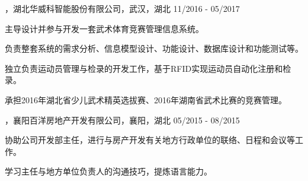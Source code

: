 
\begin{cventries}

\cvexperience
{，湖北华威科智能股份有限公司，武汉，湖北}
{11/2016 - 05/2017}
{
    \begin{cvitems}
    \item {主导设计并参与开发一套武术体育竞赛管理信息系统。}
    \item {负责整套系统的需求分析、信息模型设计、功能设计、数据库设计和功能测试等。}
    \item {独立负责运动员管理与检录的开发工作，基于RFID实现运动员自动化注册和检录。}
    \item {承担2016年湖北省少儿武术精英选拔赛、2016年湖南省武术比赛的竞赛管理。}
    \end{cvitems}
}

\cvexperience
{，襄阳百洋房地产开发有限公司，襄阳，湖北}
{05/2015 - 08/2015}
{
    \begin{cvitems}
    \item {协助公司开发部主任，进行与房产开发有关地方行政单位的联络、日程和会议等工作。}
    \item {学习主任与地方单位负责人的沟通技巧，提炼语言能力。}
    \end{cvitems}
}

\end{cventries}